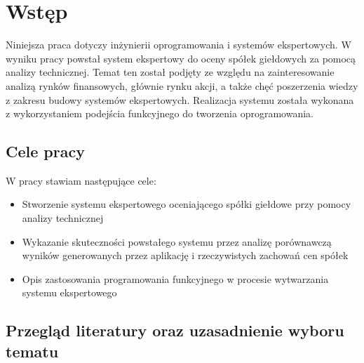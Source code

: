\chapter{Wstęp}
Niniejsza praca dotyczy inżynierii oprogramowania i systemów ekspertowych. W wyniku pracy powstał system ekspertowy do oceny spółek giełdowych za pomocą analizy technicznej. Temat ten został podjęty ze względu na zainteresowanie analizą rynków finansowych, głównie rynku akcji, a także chęć poszerzenia wiedzy z zakresu budowy systemów ekspertowych. Realizacja systemu została wykonana z wykorzystaniem podejścia funkcyjnego do tworzenia oprogramowania.

\section{Cele pracy}\label{sec:cele_pracy}

W pracy stawiam następujące cele:

\begin{itemize}
 \item Stworzenie systemu ekspertowego oceniającego spółki giełdowe przy pomocy analizy technicznej
 \item Wykazanie skuteczności powstałego systemu przez analizę porównawczą wyników generowanych przez aplikację i rzeczywistych zachowań cen spółek
 \item Opis zastosowania programowania funkcyjnego w procesie wytwarzania systemu ekspertowego
\end{itemize}

\section{Przegląd literatury oraz uzasadnienie wyboru tematu}

